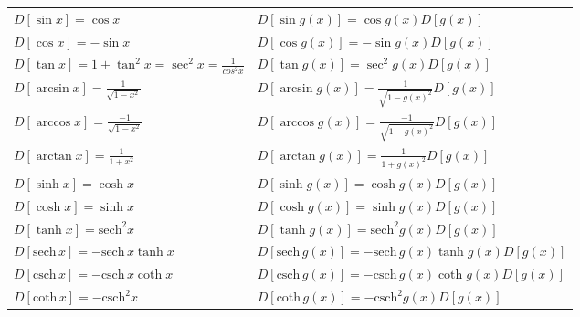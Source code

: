 \documentclass{book}
\begin{document}
\begin{theorem}
\begin{center}
\begin{tabular}{l l}
            $D[\sin x] = \cos x$                                                          & $D[\sin g(x)] = \cos g(x) D[g(x)]$                                                                    \\
            $D[\cos x] = -\sin x$                                                         & $D[\cos g(x)] = -\sin g(x) D[g(x)]$                                                                   \\
            $D[\tan x] = 1 + \tan^2 x = \sec^2 x = \displaystyle \frac{1}{cos^2 x} $      & $D[\tan g(x)] = \sec^2 g(x) D[g(x)]$                                                                  \\
            $D[\arcsin x] = \displaystyle \frac{1}{\sqrt{1-x^2}}$                         & $D[\arcsin g(x)] = \displaystyle \frac{1}{\sqrt{1-g(x)^2}} D[g(x)]$                                   \\
            $D[\arccos x] = \displaystyle \frac{-1}{\sqrt{1-x^2}}$                        & $D[\arccos g(x)] = \displaystyle \frac{-1}{\sqrt{1-g(x)^2}} D[g(x)]$                                  \\
            $D[\arctan x] = \displaystyle \frac{1}{1+x^2}$                                & $D[\arctan g(x)] = \displaystyle \frac{1}{1+g(x)^2} D[g(x)]$                                          \\
            $D[\sinh x] = \cosh x$                                                        & $D[\sinh g(x)] = \cosh g(x) D[g(x)]$                                                                  \\
            $D[\cosh x] = \sinh x$                                                        & $D[\cosh g(x)] = \sinh g(x) D[g(x)]$                                                                  \\
            $D[\tanh x] = \text{sech}^2 x$                                                & $D[\tanh g(x)] = \text{sech}^2 g(x) D[g(x)]$                                                          \\
            $D[\text{sech}\, x] = -\text{sech}\, x \tanh x$                               & $D[\text{sech}\, g(x)] = -\text{sech}\, g(x) \tanh g(x) D[g(x)]$                                      \\
            $D[\text{csch}\, x] = -\text{csch}\, x \coth x$                               & $D[\text{csch}\, g(x)] = -\text{csch}\, g(x) \coth g(x) D[g(x)]$                                      \\
            $D[\text{coth}\, x] = -\text{csch}^2 x$                                       & $D[\text{coth}\, g(x)] = -\text{csch}^2 g(x) D[g(x)]$                                                 \\
        \end{tabular}
    \end{center}
\end{theorem}
\end{document}
